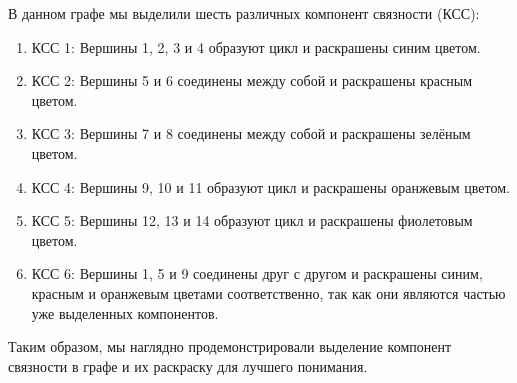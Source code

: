 \documentclass{article}
\begin{document}
В данном графе мы выделили шесть различных компонент связности (КСС):
\begin{enumerate}
\item КСС 1: Вершины 1, 2, 3 и 4 образуют цикл и раскрашены синим цветом.
\item КСС 2: Вершины 5 и 6 соединены между собой и раскрашены красным цветом.
\item КСС 3: Вершины 7 и 8 соединены между собой и раскрашены зелёным цветом.
\item КСС 4: Вершины 9, 10 и 11 образуют цикл и раскрашены оранжевым цветом.
\item КСС 5: Вершины 12, 13 и 14 образуют цикл и раскрашены фиолетовым цветом.
\item КСС 6: Вершины 1, 5 и 9 соединены друг с другом и раскрашены синим, красным и оранжевым цветами соответственно, так как они являются частью уже выделенных компонентов.
\end{enumerate}
Таким образом, мы наглядно продемонстрировали выделение компонент связности в графе и их раскраску для лучшего понимания.
\end{document}
